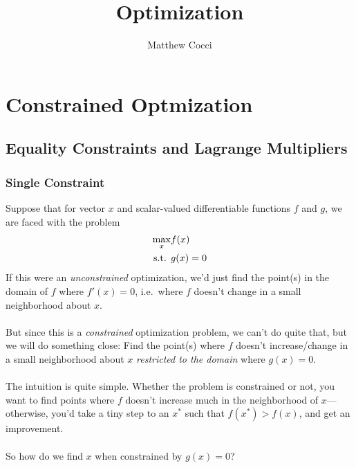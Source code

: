\documentclass[a4paper,12pt]{scrartcl}
\author{Matthew Cocci}
\title{Optimization}
\date{}
\theoremstyle{definition}
\theoremstyle{remark}
\begin{document}
\maketitle

\tableofcontents %

\clearpage
\section{Constrained Optmization}

\subsection{Equality Constraints and Lagrange Multipliers}

\subsubsection{Single Constraint}
Suppose that for vector $x$ and scalar-valued differentiable functions
$f$ and $g$, we are faced with the problem
\begin{align}
  \max_x &f(x) \label{prob:constrained}\\
  \text{s.t. } &g(x) = 0 \notag
\end{align}
If this were an \emph{unconstrained} optimization, we'd just find the
point(s) in the domain of $f$ where $f'(x)=0$, i.e.\ where $f$ doesn't
change in a small neighborhood about $x$.
\\
\\
But since this is a \emph{constrained} optimization problem, we can't do
quite that, but we will do something close: Find the point(s) where $f$
doesn't increase/change in a small neighborhood about $x$
\emph{restricted to the domain} where $g(x)=0$.
\\
\\
The intuition is quite simple. Whether the problem is constrained or
not, you want to find points where $f$ doesn't increase much in the
neighborhood of $x$---otherwise, you'd take a tiny step to an $x^*$ such
that $f(x^*) > f(x)$, and get an improvement.
\\
\\
So how do we find $x$ when constrained by $g(x)=0$?
\end{document}
